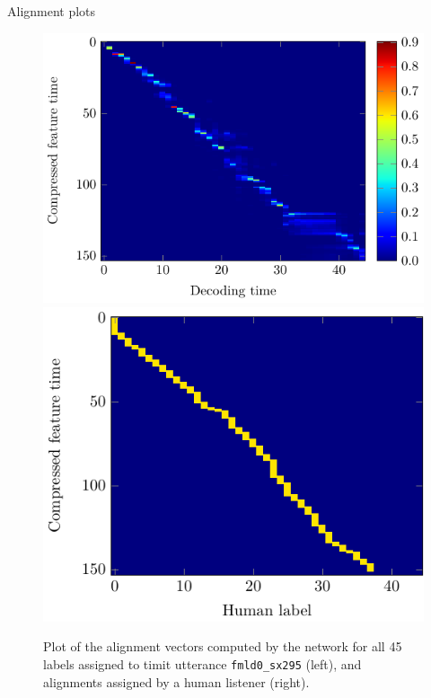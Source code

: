 \documentclass[10pt]{beamer}
\begin{document}
\begin{frame}{Alignment plots}
	\begin{figure}
	\centering
	\includegraphics[width=0.49\linewidth]{../tikz/alpha}
	\includegraphics[width=0.42\linewidth]{../tikz/align}
	\caption{Plot of the alignment vectors computed by the network for all 45 labels assigned to timit utterance \texttt{fmld0\_sx295} (left), and alignments assigned by a human listener (right).}
	\label{fig:fullAttention}
	\end{figure}
\end{frame}
\end{document}
